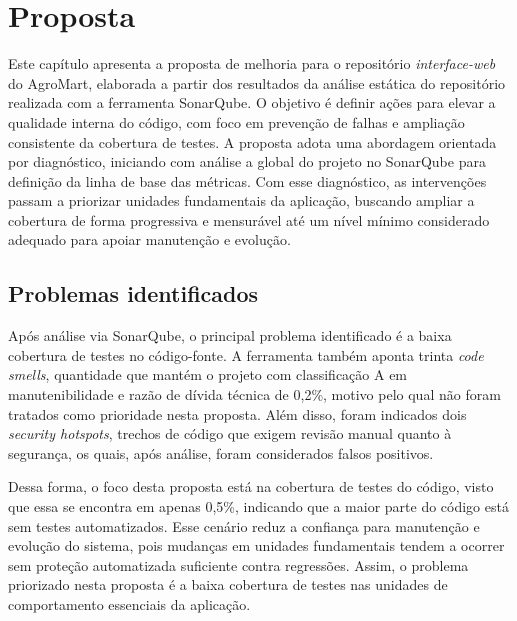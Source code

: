 \chapter{Proposta}

Este capítulo apresenta a proposta de melhoria para o repositório \textit{interface-web} do AgroMart,
elaborada a partir dos resultados da análise estática do repositório realizada com a ferramenta SonarQube.
O objetivo é definir ações para elevar a qualidade interna do código, com foco em prevenção de falhas e ampliação consistente da cobertura de testes.
A proposta adota uma abordagem orientada por diagnóstico, iniciando com análise a global do projeto no SonarQube para definição da linha de base das métricas.
Com esse diagnóstico, as intervenções passam a priorizar unidades fundamentais da aplicação, buscando ampliar a cobertura de forma progressiva e mensurável até um nível mínimo considerado adequado para apoiar manutenção e evolução.


%


\section{Problemas identificados}

Após análise via SonarQube, o principal problema identificado é a baixa cobertura de testes no código-fonte.
A ferramenta também aponta trinta \textit{code smells}, quantidade que mantém o projeto com classificação A em manutenibilidade e razão de dívida técnica de 0,2\%, motivo pelo qual não foram tratados como prioridade nesta proposta.
Além disso, foram indicados dois \textit{security hotspots}, trechos de código que exigem revisão manual quanto à segurança, os quais, após análise, foram considerados falsos positivos.

Dessa forma, o foco desta proposta está na cobertura de testes do código, visto que essa se encontra em apenas 0,5\%,
indicando que a maior parte do código está sem testes automatizados.
Esse cenário reduz a confiança para manutenção e evolução do sistema, pois mudanças em unidades fundamentais tendem a ocorrer sem proteção automatizada suficiente contra regressões.
Assim, o problema priorizado nesta proposta é a baixa cobertura de testes nas unidades de comportamento essenciais da aplicação.

